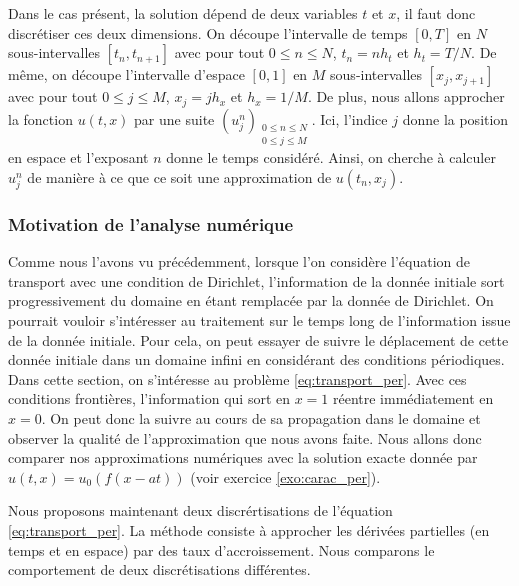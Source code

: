 \documentclass[12pt,a4paper,twoside]{article}
\begin{document}
Dans le cas pr\'esent, la solution d\'epend de deux variables $t$ et $x$,
il faut donc discr\'etiser ces deux dimensions.
On d\'ecoupe l'intervalle de temps $[0,T]$ en $N$ sous-intervalles $[t_n , t_{n+1}]$
avec pour tout $0\leq n \leq N$,  $t_n = n h_t$ et $h_t = T/N$.
De m\^eme, on d\'ecoupe l'intervalle d'espace $[0,1]$ en $M$ sous-intervalles
$[x_j , x_{j+1}]$ avec pour tout $0 \leq j \leq M$, $x_j = j h_x$ et $h_x = 1/M$. 
De plus, nous allons approcher la fonction $u(t,x)$ par une suite
$(u_j^n)_{\substack{0 \leq n \leq N \\ 0 \leq j \leq M}}$.
Ici, l'indice $j$ donne la position en espace et l'exposant $n$
donne le temps consid\'er\'e. Ainsi, on cherche \`a calculer $u_j^n$ 
de mani\`ere \`a ce que ce soit une approximation
de $u(t_n, x_j)$.

\subsubsection{Motivation de l'analyse num\'erique}

Comme nous l'avons vu pr\'ec\'edemment, lorsque l'on consid\`ere
l'\'equation de transport avec une condition de Dirichlet,
l'information de la donn\'ee initiale sort progressivement du domaine
en \'etant remplac\'ee par la donn\'ee de Dirichlet.
On pourrait vouloir s'int\'eresser au traitement sur le temps long de 
l'information issue de la donn\'ee initiale.
Pour cela, on peut essayer de suivre le d\'eplacement de cette donn\'ee
initiale dans un domaine infini en consid\'erant des conditions p\'eriodiques.
Dans cette section, on s'int\'eresse au probl\`eme
\eqref{eq:transport_per}.
Avec ces conditions fronti\`eres, l'information qui sort en 
$x=1$ r\'eentre imm\'ediatement en $x=0$.
On peut donc la suivre au cours de sa propagation dans le domaine
et observer la qualit\'e de l'approximation que nous avons faite.
Nous allons donc comparer nos approximations num\'eriques avec la solution
exacte donn\'ee par $u(t,x) = u_0(f(x-at))$ (voir exercice \ref{exo:carac_per}).


Nous proposons maintenant deux discr\'ertisations de l'\'equation
\eqref{eq:transport_per}.
La m\'ethode consiste \`a approcher les d\'eriv\'ees partielles
(en temps et en espace) par des taux d'accroissement.
Nous comparons le comportement de deux discr\'etisations diff\'erentes.
\end{document}
